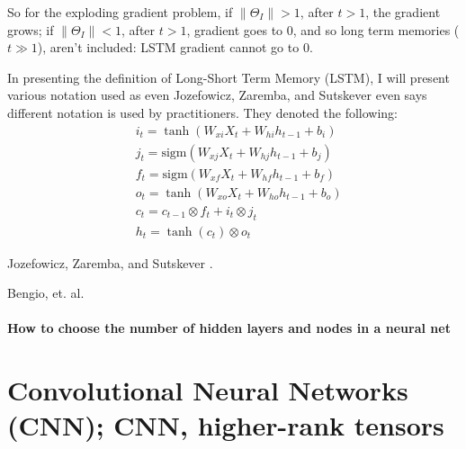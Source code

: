 \documentclass[10pt]{amsart}
\begin{document}
\begin{multicols*}{2}
So for the exploding gradient problem, if $\| \Theta_I \| >1$, after $t>1$, the gradient grows; if $\| \Theta_I \| <1$, after $t>1$, gradient goes to $0$, and so long term memories ($t \gg 1$), aren't included: LSTM gradient cannot go to $0$.  

In presenting the definition of Long-Short Term Memory (LSTM), I will present various notation used as even Jozefowicz, Zaremba, and Sutskever \cite{JZS2015} even says different notation is used by practitioners.  They denoted the following:  
\begin{equation}
\begin{aligned}
	& i_t = \tanh{(W_{xi} X_t + W_{hi} h_{t-1} + b_i )}  \\
	& j_t = \text{sigm}{(W_{xj} X_t + W_{hj} h_{t-1} + b_j )}  \\
	& f_t = \text{sigm}{(W_{xf} X_t + W_{hf} h_{t-1} + b_f )}  \\
	& o_t = \tanh{(W_{xo} X_t + W_{ho} h_{t-1} + b_o )}  \\
	& c_t =  c_{t-1}\otimes f_t + i_t \otimes j_t  \\
	& h_t = \tanh{ (c_t)}\otimes o_t  
\end{aligned}
\end{equation}



Jozefowicz, Zaremba, and Sutskever \cite{JZS2015}.  

Bengio, et. al. \cite{GBC2016}



\subsection{How to choose the number of hidden layers and nodes in a neural net}


\part{Convolutional Neural Networks (CNN); CNN, higher-rank tensors}




\end{multicols*}
\end{document}
